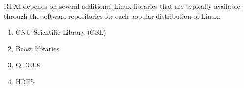 RTXI depends on several additional Linux libraries that are typically available through the software repositories for each popular distribution of Linux:
\begin{enumerate}
\item GNU Scientific Library (GSL)
\item Boost libraries
\item Qt 3.3.8
\item HDF5
\end{enumerate}